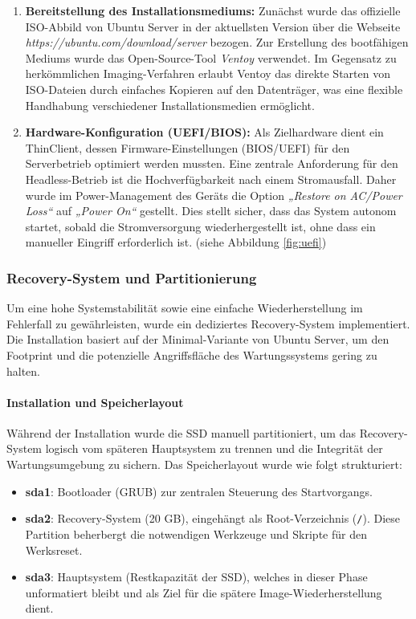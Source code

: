 \documentclass[11pt,
a4paper,
numbers=nonperiod,
footsepline,
oneside,
numbers=noenddot,
bibliography=totoc
]{scrartcl}
\begin{document}
\begin{enumerate}
	\item \textbf{Bereitstellung des Installationsmediums:} 
	Zunächst wurde das offizielle ISO-Abbild von Ubuntu Server in der aktuellsten Version über die Webseite \emph{https://ubuntu.com/download/server} \cite{ubuntu_server} bezogen. Zur Erstellung des bootfähigen Mediums wurde das Open-Source-Tool \textit{Ventoy} verwendet. Im Gegensatz zu herkömmlichen Imaging-Verfahren erlaubt Ventoy das direkte Starten von ISO-Dateien durch einfaches Kopieren auf den Datenträger, was eine flexible Handhabung verschiedener Installationsmedien ermöglicht.
	
	\item \textbf{Hardware-Konfiguration (UEFI/BIOS):} 
	Als Zielhardware dient ein ThinClient, dessen Firmware-Einstellungen (BIOS/UEFI) für den Serverbetrieb optimiert werden mussten. Eine zentrale Anforderung für den Headless-Betrieb ist die Hochverfügbarkeit nach einem Stromausfall. Daher wurde im Power-Management des Geräts die Option \textit{„Restore on AC/Power Loss“} auf \textit{„Power On“} gestellt. Dies stellt sicher, dass das System autonom startet, sobald die Stromversorgung wiederhergestellt ist, ohne dass ein manueller Eingriff erforderlich ist. (siehe Abbildung \ref{fig:uefi})
	
\end{enumerate}
\newpage
\subsubsection{Recovery-System und Partitionierung}

Um eine hohe Systemstabilität sowie eine einfache Wiederherstellung im Fehlerfall zu gewährleisten, wurde ein dediziertes Recovery-System implementiert. Die Installation basiert auf der Minimal-Variante von Ubuntu Server, um den Footprint und die potenzielle Angriffsfläche des Wartungssystems gering zu halten.

\paragraph{Installation und Speicherlayout}
Während der Installation wurde die SSD manuell partitioniert, um das Recovery-System logisch vom späteren Hauptsystem zu trennen und die Integrität der Wartungsumgebung zu sichern. Das Speicherlayout wurde wie folgt strukturiert:

\begin{itemize}
	\item \textbf{sda1}: Bootloader (GRUB) zur zentralen Steuerung des Startvorgangs.
	\item \textbf{sda2}: Recovery-System (20 GB), eingehängt als Root-Verzeichnis (\texttt{/}). Diese Partition beherbergt die notwendigen Werkzeuge und Skripte für den Werksreset.
	\item \textbf{sda3}: Hauptsystem (Restkapazität der SSD), welches in dieser Phase unformatiert bleibt und als Ziel für die spätere Image-Wiederherstellung dient.
\end{itemize}
\end{document}
